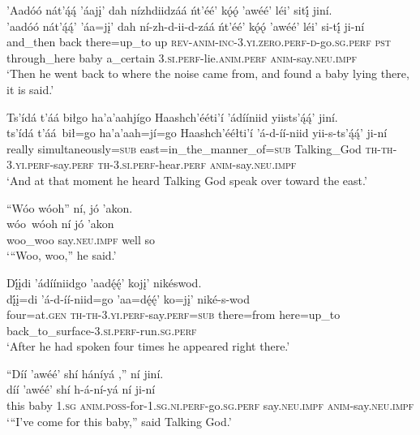 \ea\label{ex:text5-6-10}
’Aadóó nát’ą́ą́ ’áajį’ dah nízhdiidzáá ńt’éé’ kǫ́ǫ́ ’awéé’ léi’ sitį́ jiní.\\
\gll ’aadóó	nát’ą́ą́’	’áa=jį’	dah	ní-zh-d-ii-d-záá	ńt’éé’	kǫ́ǫ́	’awéé’	léi’	si-tį́	ji-ní\\
     and\_then	back	there=up\_to	up	\textsc{rev}-\textsc{anim}-\textsc{inc}-3.\textsc{yi}.\textsc{zero}.\textsc{perf}-\textsc{d}-go.\textsc{sg}.\textsc{perf}	\textsc{pst}	through\_here	baby	a\_certain	3.\textsc{si}.\textsc{perf}-lie.\textsc{anim}.\textsc{perf}	\textsc{anim}-say.\textsc{neu}.\textsc{impf}\\
\glt `Then he went back to where the noise came from, and found a baby lying there, it is said.'
\z

\ea\label{ex:text5-6-11}
Ts’ídá t’áá biłgo ha’a’aahjígo Haashch’ééti’í ’ádííniid yiists’ą́ą́’ jiní.\\
\gll ts’ídá	t’áá~{bił=go}	ha’a’aah=jí=go	Haashch’ééłti’í	’á-d-íí-niid	yii-s-ts’ą́ą́’	ji-ní\\
     really	simultaneously=\textsc{sub}	east=in\_the\_manner\_of=\textsc{sub}	Talking\_God	\textsc{th}-\textsc{th}-3.\textsc{yi}.\textsc{perf}-say.\textsc{perf}	\textsc{th}-3.\textsc{si}.\textsc{perf}-hear.\textsc{perf}	\textsc{anim}-say.\textsc{neu}.\textsc{impf}\\
\glt `And at that moment he heard Talking God speak over toward the east.'
\z

\ea\label{ex:text5-6-12}
``Wóo wóoh'' ní, jó ’akon.\\
\gll wóo~{wóoh}	ní	jó	’akon\\
     woo\_woo	say.\textsc{neu}.\textsc{impf}	well	so\\
\glt `“Woo, woo,'' he said.'
\z

\ea\label{ex:text5-6-13}
Dį́įdi ’ádííniidgo ’aadę́ę́’ kojį’ nikéswod.\\
\gll dį́į=di	’á-d-íí-niid=go	’aa=dę́ę́’	ko=jį’	niké-s-wod\\
     four=at.\textsc{gen}	\textsc{th}-\textsc{th}-3.\textsc{yi}.\textsc{perf}-say.\textsc{perf}=\textsc{sub}	there=from	here=up\_to	back\_to\_surface-3.\textsc{si}.\textsc{perf}-run.\textsc{sg}.\textsc{perf}\\
\glt `After he had spoken four times he appeared right there.'
\z

\ea\label{ex:text5-6-14}
``Díí ’awéé’ shí háníyá ,'' ní jiní.\\
\gll díí	’awéé’	shí	h-á-ní-yá	ní	ji-ní\\
     this	baby	1.\textsc{sg}	\textsc{anim}.\textsc{poss}-for-1.\textsc{sg}.\textsc{ni}.\textsc{perf}-go.\textsc{sg}.\textsc{perf}	say.\textsc{neu}.\textsc{impf}	\textsc{anim}-say.\textsc{neu}.\textsc{impf}\\
\glt `“I've come for this baby,'' said Talking God.'
\z

